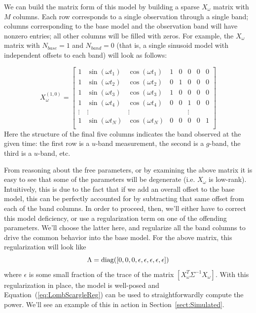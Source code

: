 \documentclass[12pt,preprint]{aastex}
\newcommand{\Eq}[1]{Equation~(\ref{eq:#1})}
\newcommand{\eq}[1]{\Eq{#1}}
\newcommand{\Sect}[1]{Section~\ref{sect:#1}}
\newcommand{\sect}[1]{\Sect{#1}}
\begin{document}
We can build the matrix form of this model by building a sparse $X_{\omega}$ matrix with $M$ columns. Each row corresponds to a single observation through a single band; columns corresponding to the base model and the observation band will have nonzero entries; all other columns will be filled with zeros. For example, the $X_\omega$ matrix with $N_{base}=1$ and $N_{band}=0$ (that is, a single sinusoid model with independent offsets to each band) will look as follows:

\begin{equation}
X_\omega^{(1,0)} = \left[
\begin{array}{cccccccc}
1 & \sin(\omega t_1) & \cos(\omega t_1) & 1 & 0 & 0 & 0 & 0\\
1 & \sin(\omega t_2) & \cos(\omega t_2) & 0 & 1 & 0 & 0 & 0\\
1 & \sin(\omega t_3) & \cos(\omega t_3) & 1 & 0 & 0 & 0 & 0\\
1 & \sin(\omega t_4) & \cos(\omega t_4) & 0 & 0 & 1 & 0 & 0\\
\vdots & \vdots & \vdots & & & \vdots & &\\
1 & \sin(\omega t_N) & \cos(\omega t_N) & 0 & 0 & 0 & 0 & 1\\
\end{array}
\right]
\end{equation}
Here the structure of the final five columns indicates the band observed at the given time: the first row is a $u$-band measurement, the second is a $g$-band, the third is a $u$-band, etc.

From reasoning about the free parameters, or by examining the above matrix it is easy to see that some of the parameters will be degenerate (i.e. $X_\omega$ is low-rank). Intuitively, this is due to the fact that if we add an overall offset to the base model, this can be perfectly accounted for by subtracting that same offset from each of the band columns. In order to proceed, then, we'll either have to correct this model deficiency, or use a regularization term on one of the offending parameters. We'll choose the latter here, and regularize all the band columns to drive the common behavior into the base model. For the above matrix,
this regularization will look like
\begin{equation}
  \Lambda = {\rm diag}([0, 0, 0, \epsilon, \epsilon, \epsilon, \epsilon, \epsilon])
\end{equation}
where $\epsilon$ is some small fraction of the trace of the matrix $[X_\omega^T\Sigma^{-1}X_\omega]$. With this regularization in place, the model is well-posed and \eq{LombScargleReg} can be used to straightforwardly compute the power. We'll see an example of this in action in \sect{Simulated}.
\end{document}
